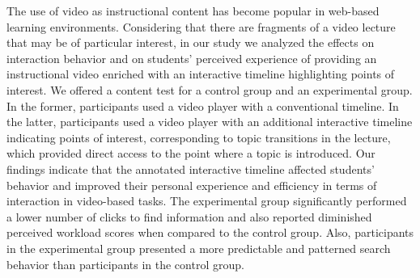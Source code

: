 The use of video as instructional content has become popular in web-based learning environments. Considering that there are fragments of a video lecture that may be of particular interest, in our study we analyzed the effects on interaction behavior and on students' perceived experience of providing an instructional video enriched with an interactive timeline highlighting points of interest. We offered a content test for a control group and an experimental group. In the former, participants used a video player with a conventional timeline. In the latter, participants used a video player with an additional interactive timeline indicating points of interest, corresponding to topic transitions in the lecture, which provided direct access to the point where a topic is introduced. Our findings indicate that the annotated interactive timeline affected students' behavior and improved their personal experience and efficiency in terms of interaction in video-based tasks. The experimental group significantly performed a lower number of clicks to find information and also reported diminished perceived workload scores when compared to the control group. Also, participants in the experimental group presented a more predictable and patterned search behavior than participants in the control group.\cite{Pimentel2019}